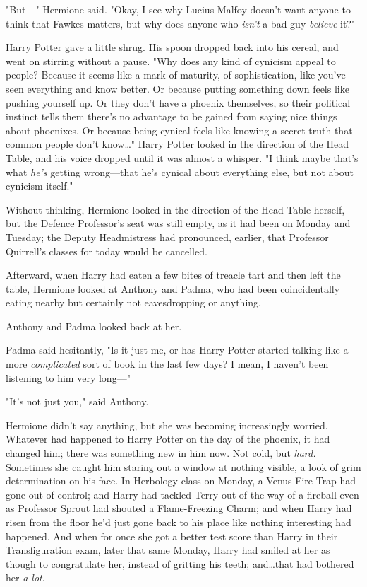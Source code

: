 "But—" Hermione said. "Okay, I see why Lucius Malfoy doesn’t want anyone to
think that Fawkes matters, but why does anyone who \emph{isn’t} a bad guy
\emph{believe} it?"

Harry Potter gave a little shrug. His spoon dropped back into his cereal, and
went on stirring without a pause. "Why does any kind of cynicism appeal to
people? Because it seems like a mark of maturity, of sophistication, like
you’ve seen everything and know better. Or because putting something down feels
like pushing yourself up. Or they don’t have a phoenix themselves, so their
political instinct tells them there’s no advantage to be gained from saying
nice things about phoenixes. Or because being cynical feels like knowing a
secret truth that common people don’t know…" Harry Potter looked in the
direction of the Head Table, and his voice dropped until it was almost a
whisper. "I think maybe that’s what \emph{he’s} getting wrong—that he’s
cynical about everything else, but not about cynicism itself."

Without thinking, Hermione looked in the direction of the Head Table herself,
but the Defence Professor’s seat was still empty, as it had been on Monday and
Tuesday; the Deputy Headmistress had pronounced, earlier, that Professor
Quirrell’s classes for today would be cancelled.

Afterward, when Harry had eaten a few bites of treacle tart and then left the
table, Hermione looked at Anthony and Padma, who had been coincidentally eating
nearby but certainly not eavesdropping or anything.

Anthony and Padma looked back at her.

Padma said hesitantly, "Is it just me, or has Harry Potter started talking like
a more \emph{complicated} sort of book in the last few days? I mean, I haven’t
been listening to him very long—"

"It’s not just you," said Anthony.

Hermione didn’t say anything, but she was becoming increasingly worried.
Whatever had happened to Harry Potter on the day of the phoenix, it had changed
him; there was something new in him now. Not cold, but \emph{hard.} Sometimes
she caught him staring out a window at nothing visible, a look of grim
determination on his face. In Herbology class on Monday, a Venus Fire Trap had
gone out of control; and Harry had tackled Terry out of the way of a fireball
even as Professor Sprout had shouted a Flame-Freezing Charm; and when Harry had
risen from the floor he’d just gone back to his place like nothing interesting
had happened. And when for once she got a better test score than Harry in
their Transfiguration exam, later that same Monday, Harry had smiled at her as
though to congratulate her, instead of gritting his teeth; and…that had
bothered her \emph{a lot}.

